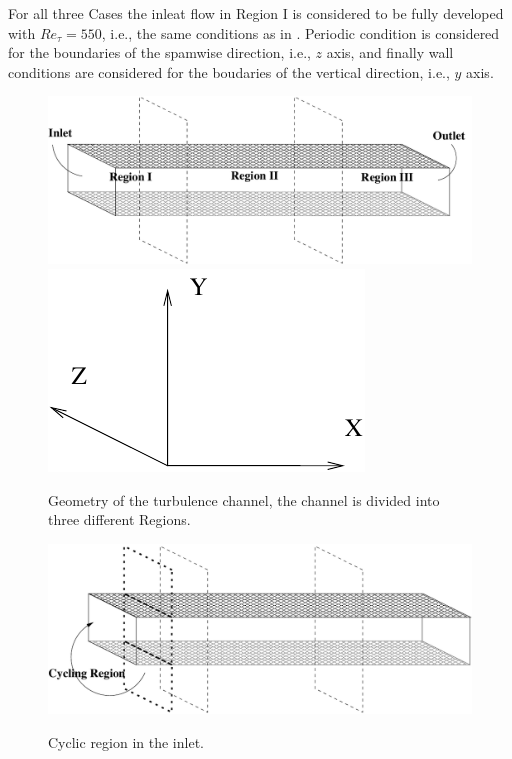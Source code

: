 \documentclass[twocolumn,10pt]{asme2e}
\begin{document}
For all three Cases the inleat flow in Region I is considered to be fully developed with \(Re_{\tau}=550\), i.e., the same conditions as in \cite{hoyas2008}. Periodic condition is considered for the boundaries of the spamwise direction, i.e., \(z\) axis, and finally wall conditions are considered for the boudaries of the vertical direction, i.e., \(y\) axis.

\begin{figure}[t]
	\centering
	\scalebox{0.5}
	{\includegraphics{geometry_turbchannel.pdf}}
	\scalebox{0.4}
	{\includegraphics{axis.pdf}}
	\caption{Geometry of the turbulence channel, the channel is divided into three different Regions.}
	\label{fig:geometry_turbchannel}
	\end{figure}

\begin{figure}[t]
	\centering
	\scalebox{0.5}
	{\includegraphics{cycling_region.pdf}}
	\caption{Cyclic region in the inlet.}
	\label{fig:cycling_region}
\end{figure}
\end{document}
